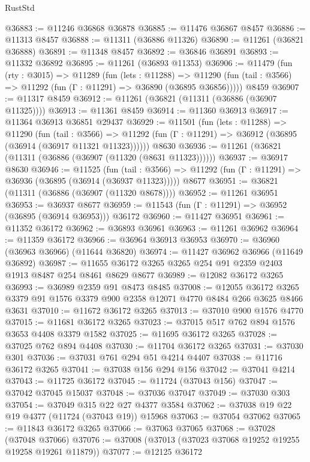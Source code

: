 \begin{lexlean}{RustStd}
\begin{coremodule}
@36883 := @11246 @36868 @36878
@36885 := @11476 @36867 @8457
@36886 := @11313 @8457
@36888 := @11311 (@36886 @11326)
@36890 := @11261 (@36821 @36888)
@36891 := @11348 @8457
@36892 := @36846 @36891
@36893 := @11332 @36892
@36895 := @11261 (@36893 @11353)
@36906 := @11479
    (fun (rty : @3015) =>
    @11289
      (fun (lets : @11288) =>
      @11290 (fun (tail : @3566) => @11292 (fun (Γ : @11291) => @36890 (@36895 @36856)))))
    @8459
@36907 := @11317 @8459
@36912 := @11261 (@36821 (@11311 (@36886 (@36907 @11325))))
@36913 := @11361 @8459
@36914 := @11360 @36913
@36917 := @11364 @36913 @36851 @29437
@36929 := @11501
    (fun (lets : @11288) =>
    @11290
      (fun (tail : @3566) =>
      @11292 (fun (Γ : @11291) => @36912 (@36895 (@36914 (@36917 @11321 @11323))))))
    @8630
@36936 := @11261 (@36821 (@11311 (@36886 (@36907 (@11320 (@8631 @11323))))))
@36937 := @36917 @8630
@36946 := @11525
    (fun (tail : @3566) => @11292 (fun (Γ : @11291) => @36936 (@36895 (@36914 (@36937 @11323)))))
    @8677
@36951 := @36821 (@11311 (@36886 (@36907 (@11320 @8678))))
@36952 := @11261 @36951
@36953 := @36937 @8677
@36959 := @11543 (fun (Γ : @11291) => @36952 (@36895 (@36914 @36953))) @36172
@36960 := @11427 @36951
@36961 := @11352 @36172
@36962 := @36893 @36961
@36963 := @11261 @36962
@36964 := @11359 @36172
@36966 := @36964 @36913 @36953
@36970 := @36960 (@36963 @36966) (@11644 @36820)
@36974 := @11427 @36962 @36966 (@11649 @36892)
@36987 := @11655 @36172 @3265 @3265 @254 @91 @2359 @2403 @1913 @8487 @254 @8461 @8629 @8677
@36989 := @12082 @36172 @3265
@36993 := @36989 @2359 @91 @8473 @8485
@37008 := @12055
    @36172
    @3265
    @3379
    @91
    @1576
    @3379
    @900
    @2358
    @12071
    @4770
    @8484
    @266
    @3625
    @8466
    @3631
@37010 := @11672 @36172 @3265
@37013 := @37010 @900 @1576 @4770
@37015 := @11681 @36172 @3265
@37023 := @37015 @517 @762 @894 @1576 @3653 @4408 @3379 @1582
@37025 := @11695 @36172 @3265
@37028 := @37025 @762 @894 @4408
@37030 := @11704 @36172 @3265
@37031 := @37030 @301
@37036 := @37031 @761 @294 @51 @4214 @4407
@37038 := @11716 @36172 @3265
@37041 := @37038 @156 @294 @156
@37042 := @37041 @4214
@37043 := @11725 @36172
@37045 := @11724 (@37043 @156)
@37047 := @37042 @37045 @15037
@37048 := @37036 @37047
@37049 := @37030 @303
@37054 := @37049 @315 @22 @27 @4377 @3584
@37062 := @37038 @19 @22 @19 @4377 (@11724 (@37043 @19)) @15968
@37063 := @37054 @37062
@37065 := @11843 @36172 @3265
@37066 := @37063 @37065
@37068 := @37028 (@37048 @37066)
@37076 := @37008 (@37013 (@37023 @37068 @19252 @19255 @19258 @19261 @11879))
@37077 := @12125 @36172

\end{coremodule}
\end{lexlean}
